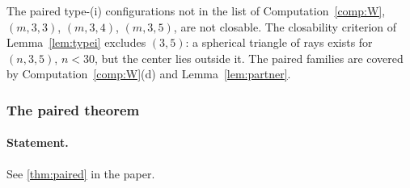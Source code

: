 \documentclass[11pt]{article}
\theoremstyle{definition}
\theoremstyle{remark}
\begin{document}
\noindent The paired type-(i) configurations not in the list of
Computation~\ref{comp:W}, $(m,3,3)$, $(m,3,4)$, $(m,3,5)$, are not closable.
The closability criterion of Lemma~\ref{lem:typei} excludes $(3,5)$:
a spherical triangle of rays exists for $(n,3,5)$, $n<30$, but the center
lies outside it. The paired families are covered by
Computation~\ref{comp:W}(d) and Lemma~\ref{lem:partner}.

\subsubsection{The paired theorem}

\paragraph{Statement.} See \ref{thm:paired} in the paper.
\end{document}
